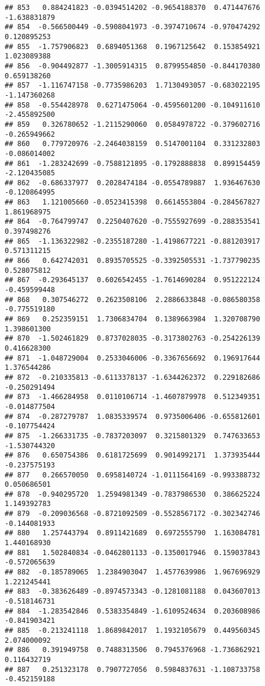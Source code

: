 \documentclass[
]{article}
\begin{document}
\begin{verbatim}
## 853   0.884241823 -0.0394514202 -0.9654188370  0.471447676 -1.638831879
## 854  -0.566500449 -0.5908041973 -0.3974710674 -0.970474292  0.120895253
## 855  -1.757906823  0.6894051368  0.1967125642  0.153854921  1.023089388
## 856  -0.904492877 -1.3005914315  0.8799554850 -0.844170380  0.659138260
## 857  -1.116747158 -0.7735986203  1.7130493057 -0.683022195 -1.147360268
## 858  -0.554428978  0.6271475064 -0.4595601200 -0.104911610 -2.455892500
## 859   0.326780652 -1.2115290060  0.0584978722 -0.379602716 -0.265949662
## 860   0.779720976 -2.2464038159  0.5147001104  0.331232803 -0.086014002
## 861  -1.283242699 -0.7588121895 -0.1792888838  0.899154459 -2.120435085
## 862  -0.686337977  0.2028474184 -0.0554789887  1.936467630 -0.120864995
## 863   1.121005660 -0.0523415398  0.6614553804 -0.284567827  1.861968975
## 864  -0.764799747  0.2250407620 -0.7555927699 -0.288353541  0.397498276
## 865  -1.136322982 -0.2355187280 -1.4198677221 -0.881203917  0.571311215
## 866   0.642742031  0.8935705525 -0.3392505531 -1.737790235  0.528075812
## 867  -0.293645137  0.6026542455 -1.7614690284  0.951222124 -0.459599448
## 868   0.307546272  0.2623508106  2.2886633848 -0.086580358 -0.775519180
## 869   0.252359151  1.7306834704  0.1389663984  1.320708790  1.398601300
## 870  -1.502461829  0.8737028035 -0.3173802763 -0.254226139  0.416628300
## 871  -1.048729004  0.2533046006 -0.3367656692  0.196917644  1.376544286
## 872  -0.210335813 -0.6113378137 -1.6344262372  0.229182686 -0.250291494
## 873  -1.466284958  0.0110106714 -1.4607879978  0.512349351 -0.014877504
## 874  -0.287279787  1.0835339574  0.9735006406 -0.655812601 -0.107754424
## 875  -1.266331735 -0.7837203097  0.3215801329  0.747633653 -1.530744320
## 876   0.650754386  0.6181725699  0.9014992171  1.373935444 -0.237575193
## 877   0.266570050  0.6958140724 -1.0111564169 -0.993388732  0.050686501
## 878  -0.940295720  1.2594981349 -0.7837986530  0.386625224  1.149392783
## 879  -0.209036568 -0.8721092509 -0.5528567172 -0.302342746 -0.144081933
## 880   1.257443794  0.8911421689  0.6972555790  1.163084781  1.440168930
## 881   1.502840834 -0.0462801133 -0.1350017946  0.159037843 -0.572065639
## 882  -0.185789065  1.2384903047  1.4577639986  1.967696929  1.221245441
## 883  -0.383626489 -0.8974573343 -0.1281081188  0.043607013 -0.518146731
## 884  -1.283542846  0.5383354849 -1.6109524634  0.203608986 -0.841903421
## 885  -0.213241118  1.8689842017  1.1932105679  0.449560345  2.074000092
## 886   0.391949758  0.7488313506  0.7945376968 -1.736862921  0.116432719
## 887   0.251323178  0.7907727056  0.5984837631 -1.108733758 -0.452159188

\end{verbatim}
\end{document}
